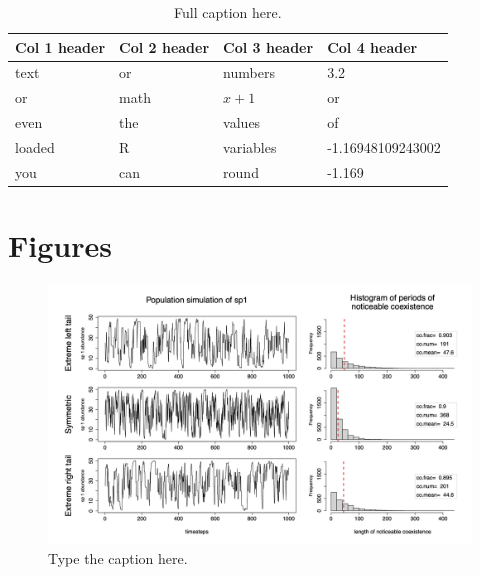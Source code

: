 \documentclass[letterpaper,11pt]{article}
\begin{document}
\begin{table}[H]
\caption[Summary caption, for table of contents, can be skipped.]{Full caption here.}
\begin{tabular}{llll} %
\hline 
Col 1 header & Col 2 header & Col 3 header & Col 4 header \\
\hline
text & or & numbers & 3.2 \\
or & math & $x+1$ & or \\
even & the & values & of \\
loaded & R & variables & -1.16948109243002 \\
you & can & round & -1.169 \\ 
\hline
\end{tabular}
\label{tab:random_table}
\end{table}

\clearpage
\newpage


\section{Figures}

\begin{figure}[!h]
\includegraphics[width=.5\textwidth]{figures/summaryDocFigures/figure8.png}
\caption{Type the caption here.} \label{fig:random_fig}
\end{figure}
\end{document}
